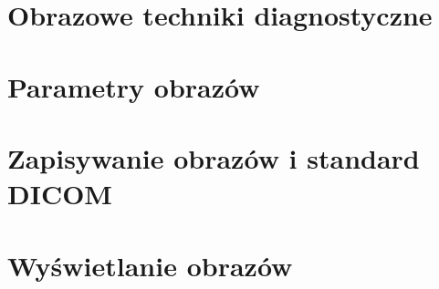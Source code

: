 
\section{Obrazowe techniki diagnostyczne}


\section{Parametry obrazów}


\section{Zapisywanie obrazów i standard DICOM}


\section{Wyświetlanie obrazów}

